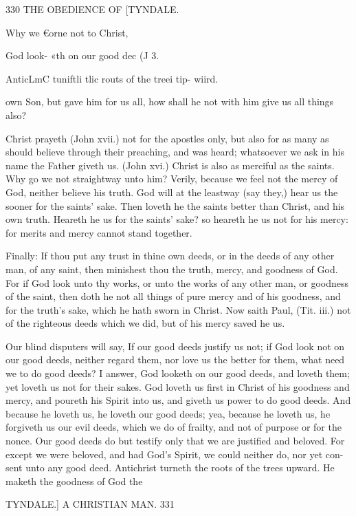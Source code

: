 \documentclass{custom}
\begin{document}
{330 
THE OBEDlENCE OF
[TYNDALE.

Why we 
€orne not 
to Christ, 

God look- 
«th on our 
good dec (J 3. 

AnticLmC 
tuniftli tlic 
routs of the 
treei tip- 
wiird. 

own Son, but gave him for us all, how shall he not with 
him give us all things also? 

Christ prayeth (John xvii.) not for the apostles only, but 
also for as many as should believe through their preaching, 
and was heard; whatsoever we ask in his name the Father 
giveth us. (John xvi.) Christ is also as merciful as the 
saints. Why go we not straightway unto him? Verily, 
because we feel not the mercy of God, neither believe his 
truth. God will at the leastway (say they,) hear us the 
sooner for the saints' sake. Then loveth he the saints 
better than Christ, and his own truth. Heareth he us for 
the saints' sake? so heareth he us not for his mercy: for 
merits and mercy cannot stand together. 

Finally: If thou put any trust in thine own deeds, or 
in the deeds of any other man, of any saint, then minishest 
thou the truth, mercy, and goodness of God. For if God 
look unto thy works, or unto the works of any other man, 
or goodness of the saint, then doth he not all things of 
pure mercy and of his goodness, and for the truth's sake, 
which he hath sworn in Christ. Now saith Paul, (Tit. iii.) 
not of the righteous deeds which we did, but of his 
mercy saved he us. 

Our blind disputers will say, If our good deeds justify 
us not; if God look not on our good deeds, neither regard 
them, nor love us the better for them, what need we to do 
good deeds? I answer, God looketh on our good deeds, 
and loveth them; yet loveth us not for their sakes. God 
loveth us first in Christ of his goodness and mercy, and 
poureth his Spirit into us, and giveth us power to do good 
deeds. And because he loveth us, he loveth our good 
deeds; yea, because he loveth us, he forgiveth us our evil 
deeds, which we do of frailty, and not of purpose or for 
the nonce. Our good deeds do but testify only that we 
are justified and beloved. For except we were beloved, 
and had God's Spirit, we could neither do, nor yet con- 
sent unto any good deed. Antichrist turneth the roots of 
the trees upward. He maketh the goodness of God the 


TYNDALE.]
A CHRISTIAN MAN.
331

}
\end{document}
